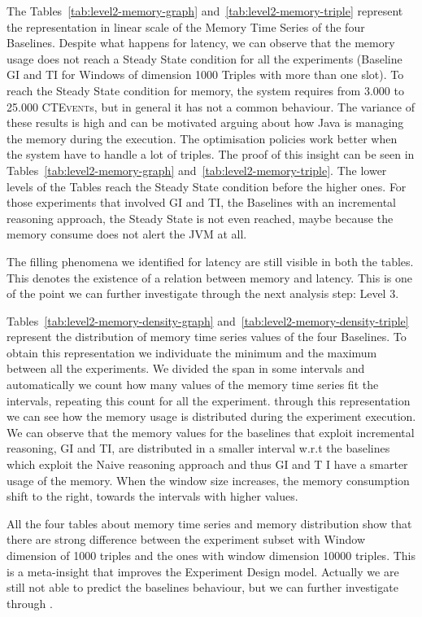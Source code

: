 The Tables~\ref{tab:level2-memory-graph} and~\ref{tab:level2-memory-triple} represent the  representation in linear scale of the Memory Time Series of the four Baselines. Despite what happens for latency, we can observe that the memory usage does not reach a Steady State condition for all the experiments (Baseline GI and TI for Windows of dimension 1000 Triples with more than one slot).  To reach the Steady State condition for memory, the system requires from 3.000 to 25.000 \textsc{CTEvent}s, but in general it has not a common behaviour. The variance of these results is high and can be motivated arguing about how Java is managing the memory during the execution. The optimisation policies work better when the system have to handle a lot of triples. The proof of this insight can be seen in Tables~\ref{tab:level2-memory-graph} and~\ref{tab:level2-memory-triple}. The lower levels of the Tables reach the Steady State condition before the higher ones. For those experiments that involved GI and TI, the Baselines with an incremental reasoning approach, the Steady State is not even reached, maybe because the memory consume does not alert the JVM at all. 

The filling phenomena we identified for latency are still visible in both the tables. This denotes the existence of a relation between memory and latency. This is one of the point we can further investigate through the next analysis step: Level 3.

Tables~\ref{tab:level2-memory-density-graph} and~\ref{tab:level2-memory-density-triple} represent the distribution of memory time series values of the four Baselines. To obtain this representation we individuate the minimum and the maximum between all the experiments. We divided the span in some intervals and automatically we count how many values of the memory time series fit the intervals, repeating this count for all the experiment. through this representation we can see how the memory usage is distributed during the experiment execution. We can observe that the memory values for the baselines that exploit incremental reasoning, GI and TI, are distributed in a smaller interval w.r.t the baselines which exploit the Naive reasoning approach and thus GI and T I have a smarter usage of the memory. When the window size increases, the memory consumption shift to the right, towards the intervals with higher values.

All the four tables about memory time series and memory distribution show that there are strong difference between the experiment subset with Window dimension of 1000  triples and the ones with window dimension 10000 triples. This is a meta-insight that improves the Experiment Design model. Actually we are still not able to predict the baselines behaviour, but we can further investigate through \namens.

